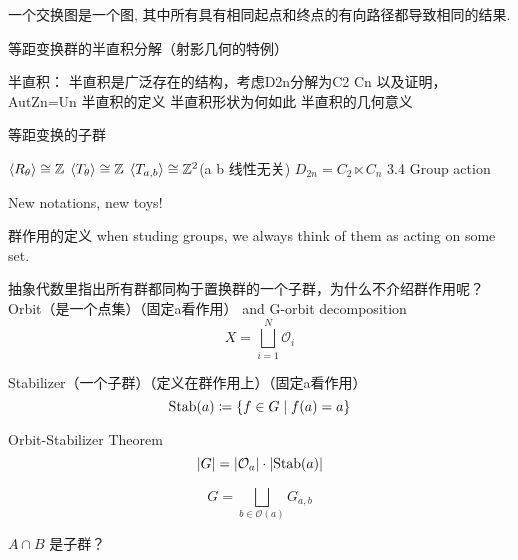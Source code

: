 \begin{definition}
    一个交换图是一个图, 其中所有具有相同起点和终点的有向路径都导致相同的结果.
    \begin{figure}[H]
        \centering
    \end{figure}
\end{definition}

等距变换群的半直积分解（射影几何的特例）

半直积：
半直积是广泛存在的结构，考虑D2n分解为C2 Cn 以及证明，AutZn=Un
半直积的定义
半直积形状为何如此
半直积的几何意义

等距变换的子群

\(\langle R_{\theta} \rangle\cong \mathbb{Z}\)
\(\langle T_{\theta} \rangle\cong \mathbb{Z}\)
\(\langle T_{a,b} \rangle\cong \mathbb{Z}^{2}\)(a b 线性无关)
\(D_{2n}=C_{2}\ltimes C_{n}\)
3.4 Group action

New notations, new toys!

群作用的定义
when studing groups, we always think of them as acting on some set.

抽象代数里指出所有群都同构于置换群的一个子群，为什么不介绍群作用呢？
Orbit（是一个点集）（固定a看作用） and G-orbit decomposition
\[
    X=\bigsqcup_{i=1}^{N} \mathcal{O}_{i}
\]

Stabilizer（一个子群）（定义在群作用上）（固定a看作用）
\[
    \operatorname{\mathrm{Stab}}(a)\coloneq \left\{ f \in G \mid f(a)=a \right\}
\]

Orbit-Stabilizer Theorem
\[
    \left| G \right| = \left| \mathcal{O}_{a} \right| \cdot
    \left| \operatorname{\mathrm{Stab}}(a) \right|
\]

\[
    G= \bigsqcup_{b\in \mathcal{O}(a)} G_{a,b}
\]

\(A\cap B\) 是子群？
